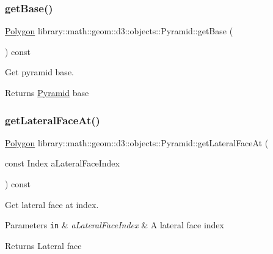 \subsubsection{\texorpdfstring{get\+Base()}{getBase()}}
{\footnotesize\ttfamily \hyperlink{classlibrary_1_1math_1_1geom_1_1d3_1_1objects_1_1_polygon}{Polygon} library\+::math\+::geom\+::d3\+::objects\+::\+Pyramid\+::get\+Base (\begin{DoxyParamCaption}{ }\end{DoxyParamCaption}) const}



Get pyramid base. 

\begin{DoxyReturn}{Returns}
\hyperlink{classlibrary_1_1math_1_1geom_1_1d3_1_1objects_1_1_pyramid}{Pyramid} base 
\end{DoxyReturn}
\mbox{\label{classlibrary_1_1math_1_1geom_1_1d3_1_1objects_1_1_pyramid_a36f5527c9708f2d44fdddaf7c9ac5ea0}} 
\subsubsection{\texorpdfstring{get\+Lateral\+Face\+At()}{getLateralFaceAt()}}
{\footnotesize\ttfamily \hyperlink{classlibrary_1_1math_1_1geom_1_1d3_1_1objects_1_1_polygon}{Polygon} library\+::math\+::geom\+::d3\+::objects\+::\+Pyramid\+::get\+Lateral\+Face\+At (\begin{DoxyParamCaption}\item[{const Index}]{a\+Lateral\+Face\+Index }\end{DoxyParamCaption}) const}



Get lateral face at index. 


\begin{DoxyParams}[1]{Parameters}
\mbox{\tt in}  & {\em a\+Lateral\+Face\+Index} & A lateral face index \\
\hline
\end{DoxyParams}
\begin{DoxyReturn}{Returns}
Lateral face 
\end{DoxyReturn}
\mbox{\label{classlibrary_1_1math_1_1geom_1_1d3_1_1objects_1_1_pyramid_ac208d0799c3180c01db9d5d988d73118}} 
